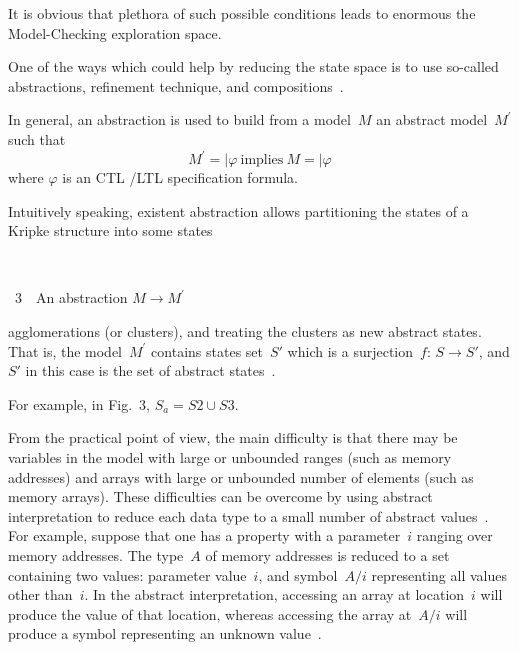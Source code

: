 \begin{multicols}{2}
It is obvious that plethora of such possible conditions leads to enormous the Model-Checking 
exploration space.

One of the ways which could help by reducing the state space is to use so-called abstractions, 
refinement technique, and compositions~\cite{1fr, 3fr}.

In general, an abstraction is used to build from a model~$M$ an abstract model~$M^\prime$ such 
that
$$
M^\prime =\!\!\!\vert\varphi \ \mbox{implies}\  M =\!\!\!\vert\varphi
$$
where $\varphi$ is an CTL /LTL specification formula.


Intuitively speaking, existent abstraction allows partitioning the states of a Kripke structure into 
some states\linebreak\vspace*{-12pt}
\begin{center} %
\vspace*{-6pt}
\mbox{%
\epsfxsize=77.743mm
}
\end{center}
\vspace*{-6pt}
\begin{center}
{{\figurename~3}\ \ \small{An abstraction $M\rightarrow M^\prime$}}
\end{center}

\bigskip
\addtocounter{figure}{1}

\noindent
 agglomerations (or clusters), and treating the clusters as new abstract states. That is, 
the model~$M^\prime$ contains states set~$S'$ which is a surjection~$f$: $S\rightarrow  S'$, 
and $S'$ in this case is the set of abstract states~\cite{1fr}.

For example, in Fig.~3, $S_a=S2\cup S3$.

From the practical point of view, the main difficulty is that there may be variables in the model 
with large or unbounded ranges (such as memory addresses) and arrays with large or unbounded 
number of elements (such as memory arrays). These difficulties can be overcome by using 
abstract interpretation to reduce each data type to a small number of abstract values~\cite{13fr}. 
For example, suppose that one has a property with a parameter~$i$ ranging over memory addresses. 
The type~$A$ of memory addresses is reduced to a set containing two values: parameter value~$i$, 
and symbol~$A/i$ representing all values other than~$i$. In the abstract interpretation, accessing 
an array at location~$i$ will produce the value of that location, whereas accessing the array 
at~$A/i$ will produce a symbol representing an unknown value~\cite{1fr}.


\end{multicols}
